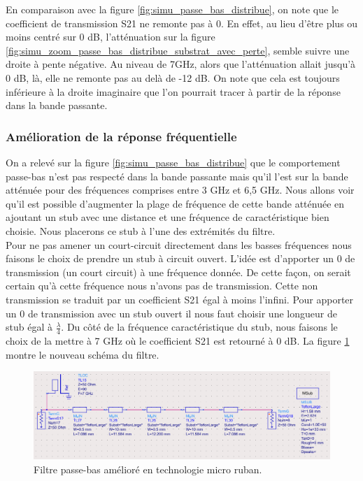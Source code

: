 \documentclass[french]{article}
\begin{document}
En comparaison avec la figure \ref{fig:simu_passe_bas_distribue}, on note que le coefficient de transmission S21 ne remonte pas à 0. En effet, au lieu d'être plus ou moins centré sur 0 dB, l'atténuation sur la figure \ref{fig:simu_zoom_passe_bas_distribue_substrat_avec_perte}, semble suivre une droite à pente négative. Au niveau de 7GHz, alors que l'atténuation allait jusqu'à 0 dB, là, elle ne remonte pas au delà de -12 dB. On note que cela est toujours inférieure à la droite imaginaire que l'on pourrait tracer à partir de la réponse dans la bande passante.


\subsubsection{Amélioration de la réponse fréquentielle}

On a relevé sur la figure \ref{fig:simu_passe_bas_distribue} que le comportement passe-bas n'est pas respecté dans la bande passante mais qu'il l'est sur la bande atténuée pour des fréquences comprises entre 3 GHz et 6,5 GHz. Nous allons voir qu'il est possible d'augmenter la plage de fréquence de cette bande atténuée en ajoutant un stub avec une distance et une fréquence de caractéristique bien choisie. Nous placerons ce stub à l'une des extrémités du filtre. \\

Pour ne pas amener un court-circuit directement dans les basses fréquences nous faisons le choix de prendre un stub à circuit ouvert. L'idée est d'apporter un 0 de transmission (un court circuit) à une fréquence donnée. De cette façon, on serait certain qu'à cette fréquence nous n'avons pas de transmission. Cette non transmission se traduit par un coefficient S21 égal à moins l'infini. Pour apporter un 0 de transmission avec un stub ouvert il nous faut choisir une longueur de stub égal à $\frac{\lambda}{4}$. Du côté de la fréquence caractéristique du stub, nous faisons le choix de la mettre à 7 GHz où le coefficient S21 est retourné à 0 dB. La figure \ref{fig:schema_distribue_ameliore_passe_bas_ads} montre le nouveau schéma du filtre.

\begin{figure}[H]
	\centering
	\includegraphics[width=15cm]{photo/passe_bas_vic/schema_distribue_ameliore_passe_bas_ads.png}
	\caption{Filtre passe-bas amélioré en technologie micro ruban.}
	\label{fig:schema_distribue_ameliore_passe_bas_ads}
\end{figure}
\end{document}
